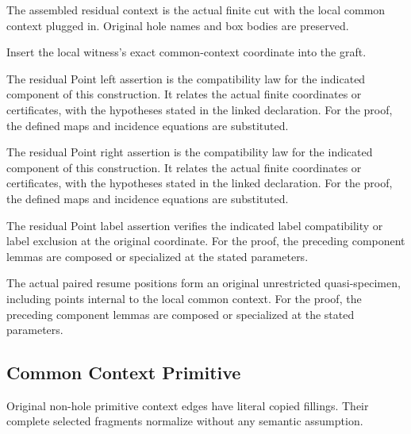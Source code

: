 The assembled residual context is the actual finite cut with the local common context plugged in. Original hole names and box bodies are preserved.
\par{}

Insert the local witness's exact common-context coordinate into the graft.
\par{}

The residual Point left assertion is the compatibility law for the indicated component of this construction. It relates the actual finite coordinates or certificates, with the hypotheses stated in the linked declaration.
For the proof, the defined maps and incidence equations are substituted.
\par{}

The residual Point right assertion is the compatibility law for the indicated component of this construction. It relates the actual finite coordinates or certificates, with the hypotheses stated in the linked declaration.
For the proof, the defined maps and incidence equations are substituted.
\par{}

The residual Point label assertion verifies the indicated label compatibility or label exclusion at the original coordinate.
For the proof, the preceding component lemmas are composed or specialized at the stated parameters.
\par{}

The actual paired resume positions form an original unrestricted quasi-specimen, including points internal to the local common context.
For the proof, the preceding component lemmas are composed or specialized at the stated parameters.
\par{}

\subsection{Common Context Primitive}
Original non-hole primitive context edges have literal copied fillings. Their complete selected fragments normalize without any semantic assumption.

